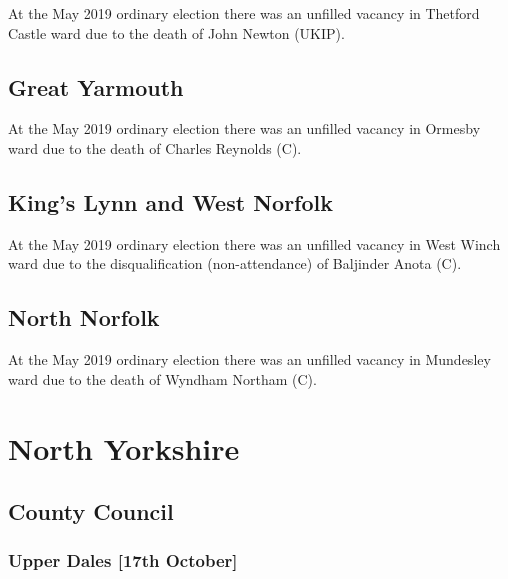 \documentclass[a4paper,openany]{book}
\begin{document}
\begin{resultsiii}
At the May 2019 ordinary election there was an unfilled vacancy in Thetford Castle ward due to the death of John Newton (UKIP).

\subsection*{Great Yarmouth}

At the May 2019 ordinary election there was an unfilled vacancy in Ormesby ward due to the death of Charles Reynolds (C).

\subsection*{King's Lynn and West Norfolk}

At the May 2019 ordinary election there was an unfilled vacancy in West Winch ward due to the disqualification (non-attendance) of Baljinder Anota (C).

\subsection*{North Norfolk}

At the May 2019 ordinary election there was an unfilled vacancy in Mundesley ward due to the death of Wyndham Northam (C).

\section{North Yorkshire}

\subsection*{County Council}

\subsubsection*{Upper Dales \hspace*{\fill}\nolinebreak[1]%
	\enspace\hspace*{\fill}
	[17th October]}



\end{resultsiii}
\end{document}

